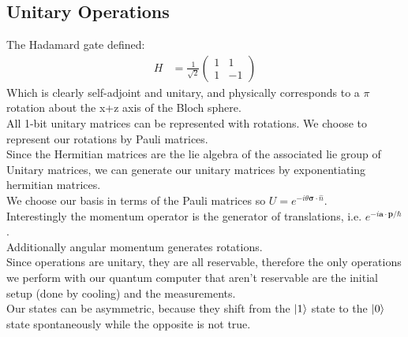 \subsection{Unitary Operations}
The Hadamard gate defined:
\begin{align*}
	H &= \frac{1}{\sqrt{2}} \begin{pmatrix}
		1 & 1 \\
		1 & -1
			 \end{pmatrix}
\end{align*}
Which is clearly self-adjoint and unitary, and physically corresponds to a $\pi$ rotation about the x+z axis of the Bloch sphere. \\
All 1-bit unitary matrices can be represented with rotations. We choose to represent our rotations by Pauli matrices.\\
Since the Hermitian matrices are the lie algebra of the associated lie group of Unitary matrices, we can generate our unitary matrices by exponentiating hermitian matrices.\\
We choose our basis in terms of the Pauli matrices so $U = e^{-i\theta \bm{\sigma} \cdot \hat{n}}$. \\
Interestingly the momentum operator is the generator of translations, i.e. $e^{-i\bm{a}\cdot\bm{p}/\hbar}$. \\
Additionally angular momentum generates rotations. \\
Since operations are unitary, they are all reservable, therefore the only operations we perform with our quantum computer that aren't reservable are the initial setup (done by cooling) and the measurements. \\
Our states can be asymmetric, because they shift from the $\ket{1}$ state to the $\ket{0}$ state spontaneously while the opposite is not true.
